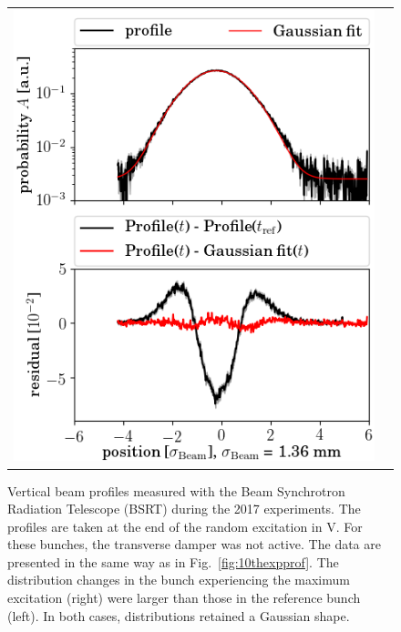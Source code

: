 \documentclass[
prstab
,reprint
,linenumbers
,longbibliography
,preprintnumbers
,showkeys
,amsfonts,amssymb,amsmath
,floatfix
]{revtex4-1}
\newlength{\bsrtwidth}
\begin{document}
\begin{figure}
\begin{tabular}{cc}
    \includegraphics[width=\bsrtwidth]{profile_v_ranv_slot_1532.png} \\
  \end{tabular}
  \caption{Vertical beam profiles measured with the Beam Synchrotron
    Radiation Telescope (BSRT) during the 2017 experiments. The
    profiles are taken at the end of the random excitation in V. For
    these bunches, the transverse damper was not active. The data are
    presented in the same way as in Fig.~\ref{fig:10thexpprof}. The
    distribution changes in the bunch experiencing the maximum
    excitation (right) were larger than those in the reference bunch
    (left). In both cases, distributions retained a Gaussian shape.}
  \label{fig:ranexpprof}
\end{figure}
\end{document}
